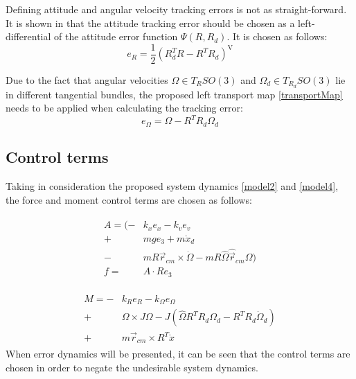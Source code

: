 \noindent Defining attitude and angular velocity tracking errors is not as straight-forward. It is shown in \cite{bulloBook} that the attitude tracking error should be chosen as a left-differential of the attitude error function $\Psi(R, R_d)$. It is chosen as follows:
\begin{equation}
	e_R = \frac{1}{2}(R_d^TR - R^TR_d)^\text{V}
\end{equation}

\noindent Due to the fact that angular velocities $\Omega \in T_RSO(3)$ and $\Omega_d \in T_{R_d}SO(3)$ lie in different tangential bundles, the proposed left transport map \ref{transportMap} needs to be applied when calculating the tracking error:
\begin{equation}
	e_\Omega = \Omega - R^TR_d\Omega_d \label{angular_error}
\end{equation}

\subsection{Control terms}

Taking in consideration the proposed system dynamics \ref{model2} and \ref{model4}, the force and moment control terms are chosen as follows:

\begin{align}
	\begin{split}
		A = (-& k_x e_x - k_v e_v \\
		+& mge_3 + m\ddot{x}_d \\
		-& mR\vec{r}_{cm}  \times \dot{\Omega} - mR\hat{\Omega}\hat{\vec{r}}_{cm}\Omega ) \\
		f =& A \cdot Re_3 \label{force_control}
	\end{split}
\end{align}

\begin{align}
	\begin{split}
		M = -& k_R e_R - k_\Omega e_\Omega \\
			+& \Omega \times J\Omega - J(\hat{\Omega}R^TR_d\Omega_d - R^TR_d\dot{\Omega}_d) \\
			+& m\vec{r}_{cm} \times R^T \ddot{x}  \label{moment_control}
	\end{split}
\end{align}
\noindent When error dynamics will be presented, it can be seen that the control terms are chosen in order to negate the undesirable system dynamics.

